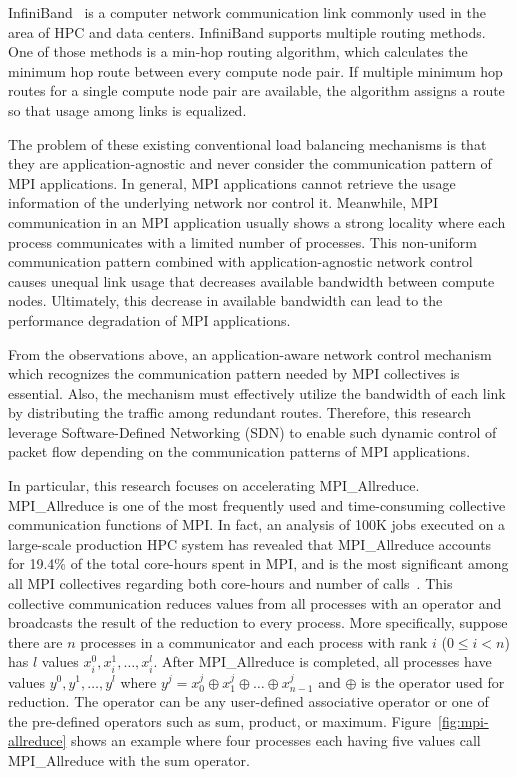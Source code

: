 InfiniBand~\autocite{Buyya2009} is a computer network communication link
commonly used in the area of HPC and data centers. InfiniBand supports
multiple routing methods. One of those methods is a min-hop routing
algorithm, which calculates the minimum hop route between every
compute node pair. If multiple minimum hop routes for a single
compute node pair are available, the algorithm assigns a route so that
usage among links is equalized.

The problem of these existing conventional load balancing mechanisms is that
they are application-agnostic and never consider the communication pattern of
MPI applications. In general, MPI applications cannot retrieve the usage
information of the underlying network nor control it. Meanwhile, MPI
communication in an MPI application usually shows a strong locality where each
process communicates with a limited number of processes. This non-uniform
communication pattern combined with application-agnostic network control
causes unequal link usage that decreases available bandwidth between compute
nodes. Ultimately, this decrease in available bandwidth can lead to the
performance degradation of MPI applications.

From the observations above, an application-aware network control mechanism
which recognizes the communication pattern needed by MPI collectives is
essential. Also, the mechanism must effectively utilize the bandwidth of each
link by distributing the traffic among redundant routes. Therefore, this
research leverage Software-Defined Networking (SDN) to enable such dynamic
control of packet flow depending on the communication patterns of MPI
applications.

In particular, this research focuses on accelerating MPI\_Allreduce.
MPI\_Allreduce is one of the most frequently used and time-consuming
collective communication functions of MPI\@. In fact, an analysis of 100K jobs
executed on a large-scale production HPC system has revealed that
MPI\_Allreduce accounts for 19.4\% of the total core-hours spent in MPI, and
is the most significant among all MPI collectives regarding both core-hours
and number of calls~\cite{Chunduri2018}. This collective communication reduces
values from all processes with an operator and broadcasts the result of the
reduction to every process. More specifically, suppose there are $n$ processes
in a communicator and each process with rank $i$ ($0 \leq i < n$) has $l$
values $x_i^0, x_i^1, \dots, x_i^l$. After MPI\_Allreduce is completed, all
processes have values $y^0, y^1, \dots, y^l$ where $y^j = x_0^j \oplus x_1^j
\oplus \dots \oplus x_{n-1}^j$ and $\oplus$ is the operator used for
reduction. The operator can be any user-defined associative operator or one of
the pre-defined operators such as sum, product, or maximum.
Figure~\ref{fig:mpi-allreduce} shows an example where four processes each
having five values call MPI\_Allreduce with the sum operator.

